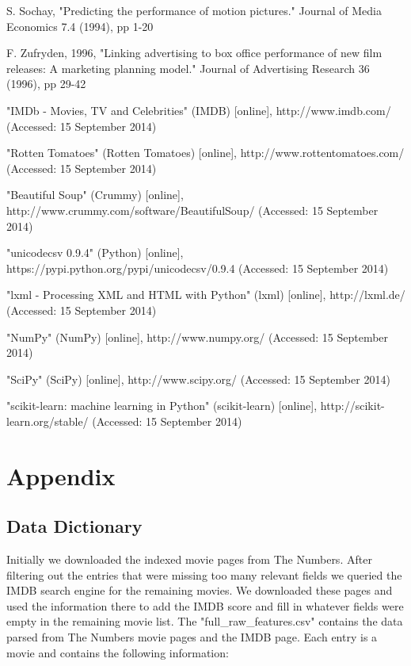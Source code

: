\documentclass[conference]{IEEEtran}
\begin{document}
\begin{thebibliography}{1}
S. Sochay, "Predicting the performance of motion pictures." Journal of Media Economics 7.4 (1994), pp 1-20

F. Zufryden, 1996, "Linking advertising to box office performance of new film releases: A marketing planning model." Journal of Advertising Research 36 (1996), pp 29-42

"IMDb - Movies, TV and Celebrities" (IMDB) [online], http://www.imdb.com/ (Accessed: 15 September 2014)

"Rotten Tomatoes" (Rotten Tomatoes) [online], http://www.rottentomatoes.com/ (Accessed: 15 September 2014)

"Beautiful Soup" (Crummy) [online], http://www.crummy.com/software/BeautifulSoup/ (Accessed: 15 September 2014)

"unicodecsv 0.9.4" (Python) [online], https://pypi.python.org/pypi/unicodecsv/0.9.4 (Accessed: 15 September 2014)

"lxml - Processing XML and HTML with Python" (lxml) [online], http://lxml.de/ (Accessed: 15 September 2014)

"NumPy" (NumPy) [online], http://www.numpy.org/ (Accessed: 15 September 2014)

"SciPy" (SciPy) [online], http://www.scipy.org/ (Accessed: 15 September 2014)

"scikit-learn: machine learning in Python" (scikit-learn) [online], http://scikit-learn.org/stable/ (Accessed: 15 September 2014)

\end{thebibliography}

\newpage
\section{Appendix}

\subsection{Data Dictionary}

Initially we downloaded the indexed movie pages from The Numbers. After filtering out the entries that were missing too many relevant fields we queried the IMDB search engine for the remaining movies. We downloaded these pages and used the information there to add the IMDB score and fill in whatever fields were empty in the remaining movie list. The "full\_raw\_features.csv" contains the data parsed from The Numbers movie pages and the IMDB page. Each entry is a movie and contains the following information:
\end{document}
